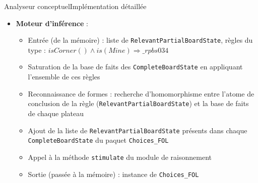 \begin{frame}{Analyseur conceptuel}{Implémentation détaillée}
\begin{itemize}
\item \textbf {Moteur d'inférence} :
\begin{itemize}
  \item Entrée (de la mémoire) : liste de \texttt{RelevantPartialBoardState},
  règles du type : 
  \pause
  \emph{$isCorner() \wedge is(Mine) \Longrightarrow \_rpbs034$}
  \pause
  \item Saturation de la base de faits des \texttt{CompleteBoardState} en
  appliquant l'ensemble de ces règles
  \pause
  \item Reconnaissance de formes : recherche d'homomorphisme entre l'atome de
  conclusion de la règle (\texttt{RelevantPartialBoardState}) et la base de
  faits de chaque plateau
  \pause
  \item Ajout de la liste de \texttt{RelevantPartialBoardState} présents dans
  chaque \texttt{CompleteBoardState} du paquet \texttt{Choices\_FOL}
  \pause
  \item Appel à la méthode \texttt{stimulate} du module de raisonnement
  \item Sortie (passée à la mémoire) : instance de \texttt{Choices\_FOL}
\end{itemize}
\end{itemize}
\end{frame}

